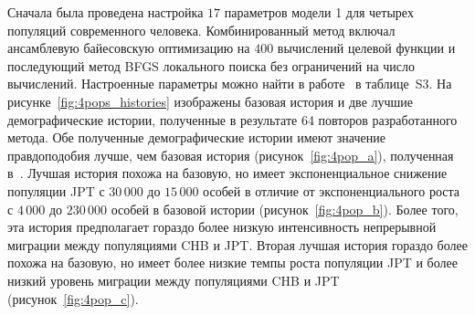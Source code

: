 Сначала была проведена настройка $17$ параметров модели 1 для четырех популяций современного человека.
Комбинированный метод включал ансамблевую байесовскую оптимизацию на $400$ вычислений целевой функции и последующий метод BFGS локального поиска без ограничений на число вычислений.
Настроенные параметры можно найти в работе~\cite{noskova2023bayesian} в таблице~S3.
На рисунке~\ref{fig:4pops_histories} изображены базовая история и две лучшие демографические истории, полученные в результате 64 повторов разработанного метода.
Обе полученные демографические истории имеют значение правдоподобия лучше, чем базовая история (рисунок~\ref{fig:4pop_a}), полученная в~\cite{jouganous2017inferring}.
Лучшая история похожа на базовую, но имеет экспоненциальное снижение популяции JPT с $30{\,}000$ до $15{\,}000$ особей в отличие от экспоненциального роста с $4{\,}000$ до $230{\,}000$ особей в базовой истории (рисунок~\ref{fig:4pop_b}).
Более того, эта история предполагает гораздо более низкую интенсивность непрерывной миграции между популяциями CHB и JPT.
Вторая лучшая история гораздо более похожа на базовую, но имеет более низкие темпы роста популяции JPT и более низкий уровень миграции между популяциями CHB и JPT (рисунок~\ref{fig:4pop_c}).


